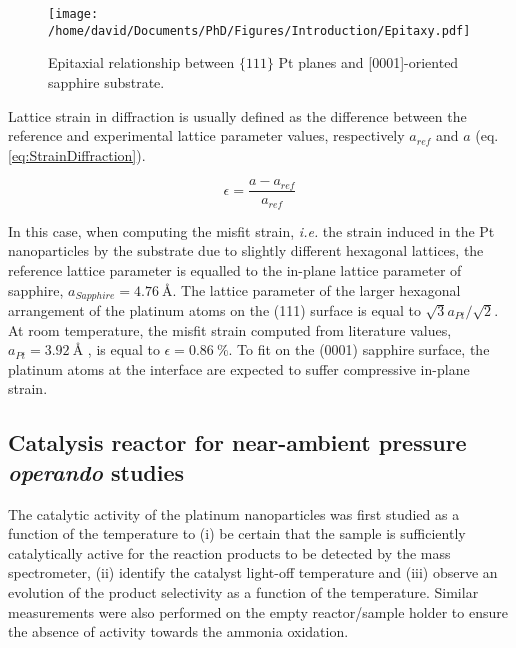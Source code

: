 \begin{figure}
    \centering
    \texttt{[image: /home/david/Documents/PhD/Figures/Introduction/Epitaxy.pdf]}
    \caption{
        Epitaxial relationship between $\{111\}$ Pt planes and [0001]-oriented sapphire substrate.
    }
    \label{fig:Epitaxy}
\end{figure}

Lattice strain in diffraction is usually defined as the difference between the reference and experimental lattice parameter values, respectively $a_{ref}$ and $a$ (eq. \ref{eq:StrainDiffraction}).

\begin{equation}
    \epsilon = \frac{a - a_{ref}}{a_{ref}}
    \label{eq:StrainDiffraction}
\end{equation}

In this case, when computing the misfit strain, \textit{i.e.} the strain induced in the Pt nanoparticles by the substrate due to slightly different hexagonal lattices, the reference lattice parameter is equalled to the in-plane lattice parameter of sapphire, $a_{Sapphire} = \qty{4.76}{\angstrom}$.
The lattice parameter of the larger hexagonal arrangement of the platinum atoms on the (111) surface is equal to $\sqrt{3} a_{Pt} / \sqrt{2}$.
At room temperature, the misfit strain computed from literature values, $a_{Pt} = \qty{3.92}{\angstrom}$ \parencite{Waseda1975}, is equal to $\epsilon = \qty{0.86}{\percent}$.
To fit on the (0001) sapphire surface, the platinum atoms at the interface are expected to suffer compressive in-plane strain.

\subsection{Catalysis reactor for near-ambient pressure \textit{operando} studies}

The catalytic activity of the platinum nanoparticles was first studied as a function of the temperature to (i) be certain that the sample is sufficiently catalytically active for the reaction products to be detected by the mass spectrometer, (ii) identify the catalyst light-off temperature and (iii) observe an evolution of the product selectivity as a function of the temperature.
Similar measurements were also performed on the empty reactor/sample holder to ensure the absence of activity towards the ammonia oxidation.

